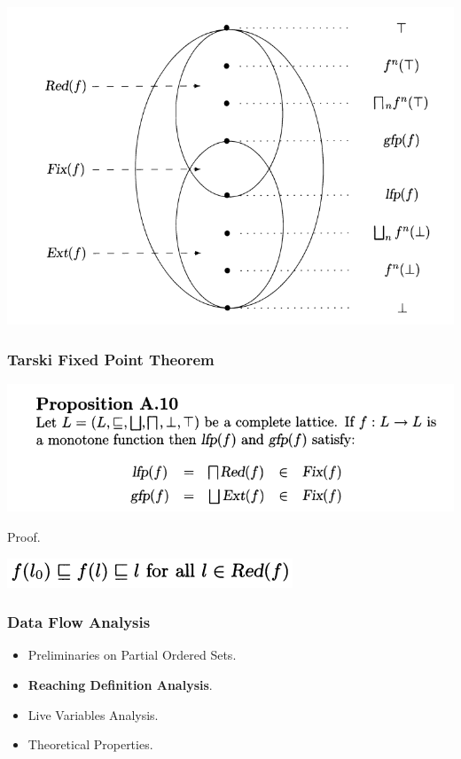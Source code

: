 \documentclass[aspectratio=1610, 13pt]{beamer}
\begin{document}
\begin{frame}
\begin{multicols}{2}
\begin{center}
\includegraphics[scale=0.27]{fixpoint_pic.png}
\end{center}
\end{multicols}
\end{frame}

\begin{frame}\frametitle{Tarski Fixed Point Theorem}

\begin{center}
\includegraphics[scale=0.4]{tarski.png}

\end{center}
Proof.

\begin{center}

\includegraphics[scale=0.4]{proof_tarski.png}
\end{center}

\end{frame}


\begin{frame}\frametitle{Data Flow Analysis}
\begin{itemize}

\item Preliminaries on Partial Ordered Sets.
\item \textbf{Reaching Definition Analysis}.
\item Live Variables Analysis.
\item Theoretical Properties.


\end{itemize}
\end{frame}
\end{document}
